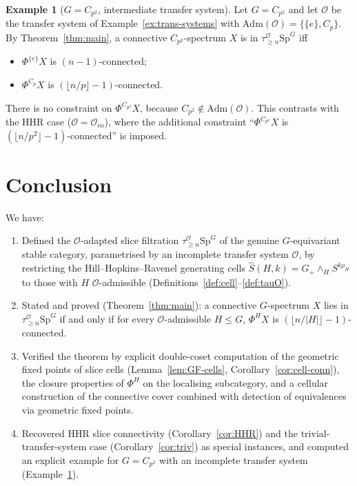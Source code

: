 \documentclass[12pt]{article}
\theoremstyle{definition}
\newtheorem{example}[theorem]{Example}
\newcommand{\SpG}{\mathrm{Sp}^{G}}
\newcommand{\PhiH}{\Phi^{H}}
\newcommand{\OO}{\mathcal{O}}
\newcommand{\admis}{\mathrm{Adm}}
\begin{document}
\begin{example}[$G=C_{p^{2}}$, intermediate transfer system]\label{ex:Cp2-app}
Let $G=C_{p^{2}}$ and let $\OO$ be the transfer system of
Example~\ref{ex:trans-systems} with $\admis(\OO)=\{\{e\},C_{p}\}$. By
Theorem~\ref{thm:main}, a connective $C_{p^{2}}$-spectrum $X$ is in
$\tau_{\geq n}^{\OO}\SpG$ iff
\begin{itemize}
\item $\Phi^{\{e\}}X$ is $(n-1)$-connected;
\item $\Phi^{C_{p}}X$ is $(\lfloor n/p\rfloor-1)$-connected.
\end{itemize}
There is no constraint on $\Phi^{C_{p^{2}}}X$, because
$C_{p^{2}}\notin\admis(\OO)$. This contrasts with the HHR case
($\OO=\OO_{\mathrm{co}}$), where the additional constraint
``$\Phi^{C_{p^{2}}}X$ is $(\lfloor n/p^{2}\rfloor-1)$-connected'' is imposed.
\end{example}

\section{Conclusion}\label{sec:concl}

We have:

\begin{enumerate}
\item Defined the $\OO$-adapted slice filtration $\tau_{\geq n}^{\OO}\SpG$ of
the genuine $G$-equivariant stable category, parametrised by an incomplete
transfer system $\OO$, by restricting the Hill--Hopkins--Ravenel generating
cells $\widehat{S}(H,k)=G_{+}\wedge_{H}S^{k\rho_{H}}$ to those with $H$
$\OO$-admissible (Definitions~\ref{def:cell}--\ref{def:tauO}).

\item Stated and proved (Theorem~\ref{thm:main}): a connective $G$-spectrum
$X$ lies in $\tau_{\geq n}^{\OO}\SpG$ if and only if for every $\OO$-admissible
$H\leq G$, $\PhiH X$ is $(\lfloor n/|H|\rfloor-1)$-connected.

\item Verified the theorem by explicit double-coset computation of the
geometric fixed points of slice cells (Lemma~\ref{lem:GF-cells},
Corollary~\ref{cor:cell-conn}), the closure properties of $\PhiH$ on the
localising subcategory, and a cellular construction of the connective cover
combined with detection of equivalences via geometric fixed points.

\item Recovered HHR slice connectivity (Corollary~\ref{cor:HHR}) and the
trivial-transfer-system case (Corollary~\ref{cor:triv}) as special instances,
and computed an explicit example for $G=C_{p^{2}}$ with an incomplete
transfer system (Example~\ref{ex:Cp2-app}).
\end{enumerate}
\end{document}
